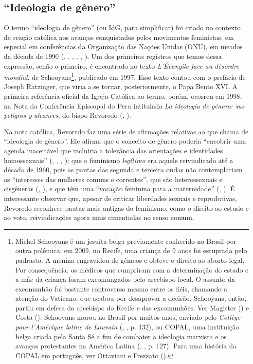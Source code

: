 \documentclass[
	12pt,				%
	openright,			%
	twoside,			%
	a4paper,			%
	english,			%
	brazil				%
	]{abntex2}
\begin{document}
 \subsection{``Ideologia de gênero''}
 O termo ``ideologia de gênero'' (ou IdG, para simplificar) foi criado no contexto de reação católica aos avanços conquistados pelos movimentos feministas, em especial em conferências da Organização das Nações Unidas (ONU), em meados da década de 1990 (, \citeyear{correa2018}, , \citeyear{machado2018}, , \citeyear{silva2018}). Um dos primeiros registros que temos dessa expressão, senão o primeiro, é encontrado no texto \emph{L’Évangile face au désordre mondial}, de Schooyans\footnote{Michel Schooyans é um jesuíta belga previamente conhecido no Brasil por outra polêmica: em 2009, no Recife, uma criança de 9 anos foi estuprada pelo padrasto. A menina engravidou de gêmeos e obteve o direito ao aborto legal. Por consequência, os médicos que cumpriram com a determinação do estado e a mãe da criança foram excomungados pelo arcebispo local. O assunto da excomunhão foi bastante controverso mesmo entre os fiéis, chamando a atenção do Vaticano, que acabou por desaprovar a decisão. Schooyans, então, partiu em defesa do arcebispo do Recife e das excomunhões. Ver Magister (\citeyear{montfort2009}) e Costa (\citeyear{bbc2009}). Schooyans morou no Brasil por muitos anos, enviado pelo \emph{Collège pour l'Amérique latine de Louvain} (, \citeyear{sappia2010}, p. 132), ou COPAL, uma instituição belga criada pela Santa Sé a fim de combater a ideologia marxista e os avanços protestantes na América Latina (, \citeyear{sappia2010}, p. 127). Para uma história da COPAL em português, ver Ottaviani e Frezzato (\citeyear{ottaviani2018}).}, publicado em 1997. Esse texto contou com o prefácio de Joseph Ratzinger, que viria a se tornar, posteriormente, o Papa Bento XVI. A primeira referência oficial da Igreja Católica ao termo, porém, ocorreu em 1998, na Nota da Conferência Episcopal do Peru intitulada \emph{La ideología de género: sus peligros y alcances}, do bispo Revoredo (, \citeyear{silva2018}).

 Na nota católica, Revoredo faz uma série de afirmações relativas ao que chama de ``ideologia de gênero''. Ele afirma que o conceito de gênero poderia ``encobrir uma agenda inaceitável que incluiria a tolerância das orientações e identidades homossexuais'' (, \citeyear{silva2018}, , \citeyear{revoredo1998}); que o feminismo \emph{legítimo} era aquele reivindicado até a década de 1960, pois as pautas das segunda e terceira ondas não contemplariam os ``interesses das mulheres comuns e correntes'', que são heterossexuais e cisgêneras (, \citeyear{silva2018}), e que têm uma ``vocação feminina para a maternidade'' (, \citeyear{revoredo1998}). É interessante observar que, apesar de criticar liberdades sexuais e reprodutivas, Revoredo reconhece pautas mais antigas do feminismo, como o direito ao estudo e ao voto, reivindicações agora mais cimentadas no senso comum.
\end{document}
